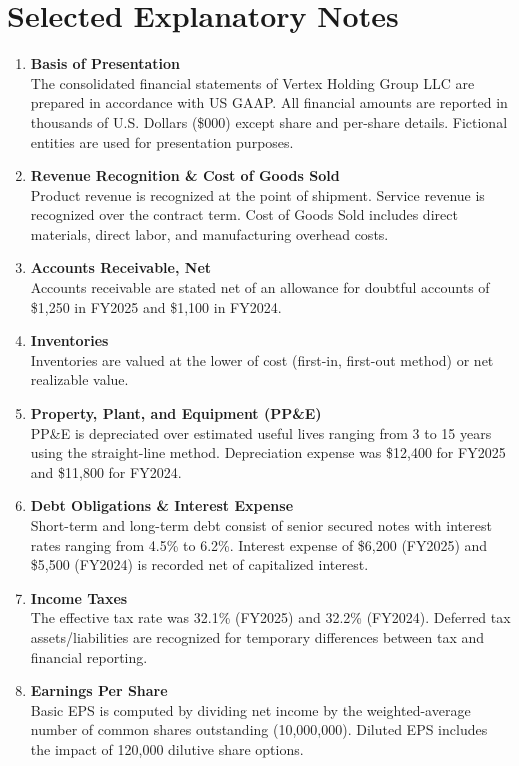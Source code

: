 \section*{Selected Explanatory Notes}
\begin{scriptsize}
\begin{enumerate}[label=\textbf{Note \arabic*:}, leftmargin=*]
  \item \textbf{Basis of Presentation} \\
    The consolidated financial statements of Vertex Holding Group LLC are prepared in accordance with US GAAP. All financial amounts are reported in thousands of U.S. Dollars (\$000) except share and per-share details. Fictional entities are used for presentation purposes.
  \item \textbf{Revenue Recognition \& Cost of Goods Sold} \\
    Product revenue is recognized at the point of shipment. Service revenue is recognized over the contract term. Cost of Goods Sold includes direct materials, direct labor, and manufacturing overhead costs.
  \item \textbf{Accounts Receivable, Net} \\
    Accounts receivable are stated net of an allowance for doubtful accounts of \$1,250 in FY2025 and \$1,100 in FY2024.
  \item \textbf{Inventories} \\
    Inventories are valued at the lower of cost (first-in, first-out method) or net realizable value.
  \item \textbf{Property, Plant, and Equipment (PP\&E)} \\
    PP\&E is depreciated over estimated useful lives ranging from 3 to 15 years using the straight-line method. Depreciation expense was \$12,400 for FY2025 and \$11,800 for FY2024.
  \item \textbf{Debt Obligations \& Interest Expense} \\
    Short-term and long-term debt consist of senior secured notes with interest rates ranging from 4.5\% to 6.2\%. Interest expense of \$6,200 (FY2025) and \$5,500 (FY2024) is recorded net of capitalized interest.
  \item \textbf{Income Taxes} \\
    The effective tax rate was 32.1\% (FY2025) and 32.2\% (FY2024). Deferred tax assets/liabilities are recognized for temporary differences between tax and financial reporting.
  \item \textbf{Earnings Per Share} \\
    Basic EPS is computed by dividing net income by the weighted-average number of common shares outstanding (10,000,000). Diluted EPS includes the impact of 120,000 dilutive share options.
\end{enumerate}
\end{scriptsize}
